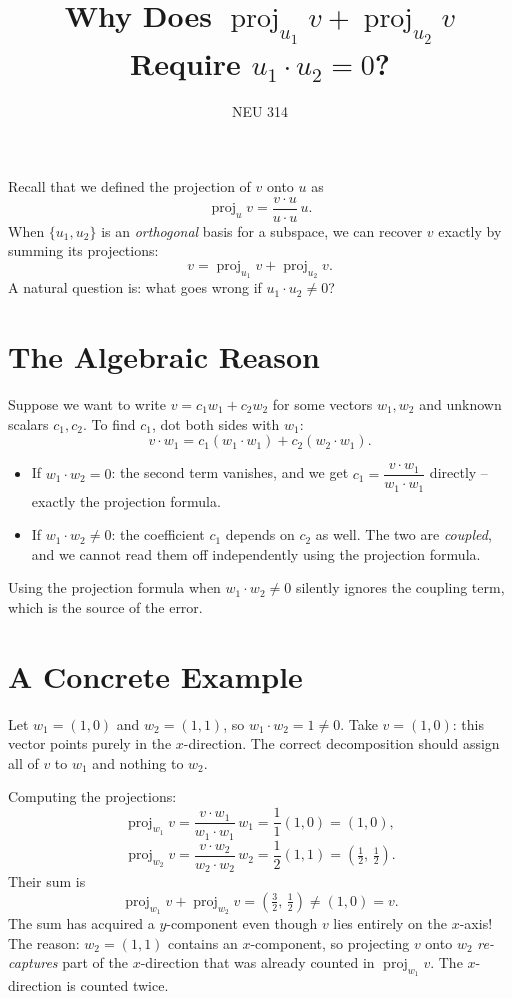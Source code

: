 \documentclass[11pt]{article}
\title{\textbf{Why Does $\operatorname{proj}_{u_1} v + \operatorname{proj}_{u_2} v$ Require $u_1 \cdot u_2 = 0$?}}
\author{NEU 314}
\date{}
\newcommand{\proj}{\operatorname{proj}}
\begin{document}
\maketitle

Recall that we defined the projection of $v$ onto $u$ as
\[
    \proj_u v = \frac{v \cdot u}{u \cdot u}\, u.
\]
When $\{u_1, u_2\}$ is an \emph{orthogonal} basis for a subspace, we can recover $v$ exactly by summing its projections:
\[
    v = \proj_{u_1} v + \proj_{u_2} v.
\]
A natural question is: what goes wrong if $u_1 \cdot u_2 \neq 0$?

\section*{The Algebraic Reason}

Suppose we want to write $v = c_1 w_1 + c_2 w_2$ for some vectors $w_1, w_2$ and unknown scalars $c_1, c_2$.
To find $c_1$, dot both sides with $w_1$:
\[
    v \cdot w_1 = c_1 (w_1 \cdot w_1) + c_2 (w_2 \cdot w_1).
\]
\begin{itemize}
    \item If $w_1 \cdot w_2 = 0$: the second term vanishes, and we get $c_1 = \dfrac{v \cdot w_1}{w_1 \cdot w_1}$ directly -- exactly the projection formula.
    \item If $w_1 \cdot w_2 \neq 0$: the coefficient $c_1$ depends on $c_2$ as well. The two are \emph{coupled}, and we cannot read them off independently using the projection formula.
\end{itemize}
Using the projection formula when $w_1 \cdot w_2 \neq 0$ silently ignores the coupling term, which is the source of the error.

\section*{A Concrete Example}

Let $w_1 = (1, 0)$ and $w_2 = (1, 1)$, so $w_1 \cdot w_2 = 1 \neq 0$.
Take $v = (1, 0)$: this vector points purely in the $x$-direction.
The correct decomposition should assign all of $v$ to $w_1$ and nothing to $w_2$.

Computing the projections:
\[
    \proj_{w_1} v
    = \frac{v \cdot w_1}{w_1 \cdot w_1}\, w_1
    = \frac{1}{1}(1, 0)
    = (1, 0),
\]
\[
    \proj_{w_2} v
    = \frac{v \cdot w_2}{w_2 \cdot w_2}\, w_2
    = \frac{1}{2}(1, 1)
    = \left(\tfrac{1}{2},\, \tfrac{1}{2}\right).
\]
Their sum is
\[
    \proj_{w_1} v + \proj_{w_2} v
    = \left(\tfrac{3}{2},\, \tfrac{1}{2}\right)
    \neq (1, 0) = v.
\]
The sum has acquired a $y$-component even though $v$ lies entirely on the $x$-axis!
The reason: $w_2 = (1,1)$ contains an $x$-component, so projecting $v$ onto $w_2$ \emph{re-captures} part of the $x$-direction that was already counted in $\proj_{w_1} v$. The $x$-direction is counted twice.
\end{document}
